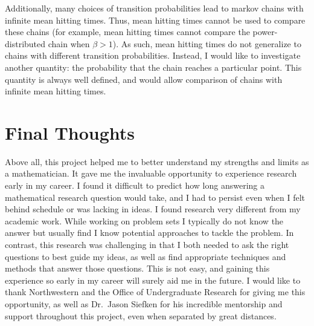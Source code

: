 \documentclass[12pt,letterpaper]{article}
\begin{document}
Additionally, many choices of transition probabilities lead to markov chains with infinite mean hitting
times. Thus, mean hitting times cannot be used to compare these chains (for example, mean hitting times
cannot compare the power-distributed chain when $\beta > 1$). As such, mean hitting times do not
generalize to chains with different transition probabilities. Instead, I would like to investigate
another quantity: the probability that the chain reaches a particular point. This quantity is always
well defined, and would allow comparison of chains with infinite mean hitting times.


\section*{Final Thoughts}
Above all, this project helped me to better understand my strengths and limits as a mathematician. It
gave me the invaluable opportunity to experience research early in my career. I found it difficult to
predict how long answering a mathematical research question would take, and I had to persist even when I
felt behind schedule or was lacking in ideas. I found research very different from my academic work.
While working on problem sets I typically do not know the answer but usually find I know potential
approaches to tackle the problem. In contrast, this research was challenging in that I both needed to
ask the right questions to best guide my ideas, as well as find appropriate techniques and methods that
answer those questions. This is not easy, and gaining this experience so early in my career
will surely aid me in the future. I would like to thank Northwestern and the Office of Undergraduate
Research for giving me this opportunity, as well as Dr.~Jason Siefken for his incredible mentorship and
support throughout this project, even when separated by great distances.
\end{document}
